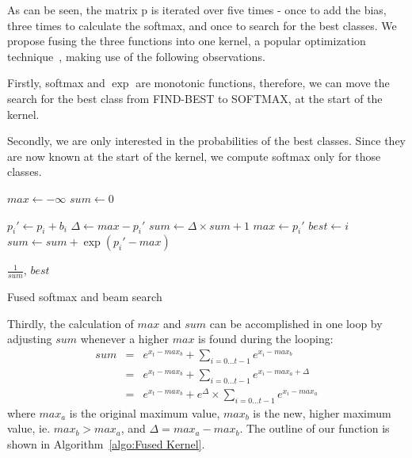\documentclass[11pt,a4paper]{article}
\begin{document}
As can be seen, the matrix p is iterated over five times - once to add the bias, three times to calculate the softmax, and once to search for the best classes. We propose fusing the three functions into one kernel, a popular optimization technique~\citep{Guevara2009EnablingTP}, making use of the following observations.

Firstly, softmax and $\exp$ are monotonic functions, therefore, we can move the search for the best class from FIND-BEST to SOFTMAX, at the start of the kernel.

Secondly, we are only interested in the probabilities of the best classes. Since they are now known at the start of the kernel, we compute softmax only for those classes.

\begin{algorithm}
\begin{algorithmic}


\State $max \gets - \infty$ 
\State $sum \gets 0$ 

  \State $p_i' \gets p_i + b_i$  
    \State $\Delta \gets max - p_i'$
    \State $sum \gets \Delta \times sum + 1 $
    \State $max \gets p_i'$
    \State $best \gets i$
  \Else
    \State $sum \gets sum + \exp(p_i' - max)$
  \EndIf
\EndFor

\Return $\frac{1}{sum}$, $best$ 

\EndProcedure
\end{algorithmic}

\caption{Fused softmax and beam search}
\label{algo:Fused Kernel}
\end{algorithm}

Thirdly, the calculation of $max$ and $sum$ can be accomplished in one loop by adjusting $sum$ whenever a higher $max$ is found during the looping:
\begin{eqnarray*}
sum & = & e^{x_t - max_b} + \sum_{i=0...t-1}{e^{x_i - max_b}} \\
    & = & e^{x_t - max_b} + \sum_{i=0...t-1}{e^{x_i - max_a + \Delta}}  \\
    & = & e^{x_t - max_b} + e^{\Delta} \times \sum_{i=0...t-1}{e^{x_i - max_a}} 
\end{eqnarray*}
where $max_a$ is the original maximum value, $max_b$ is the new, higher maximum value, ie. $max_b > max_a$, and $\Delta = max_a - max_b$. The outline of our function is shown in Algorithm~\ref{algo:Fused Kernel}.
\end{document}

